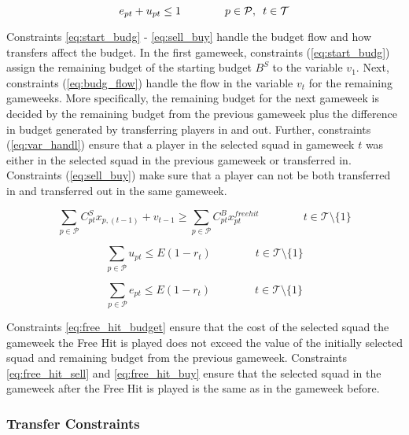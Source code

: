 \begin{equation} \label{eq:sell_buy}
   e_{pt} + u_{pt} \leq 1  \qquad\qquad p \in \mathcal{P}, \enskip t \in \mathcal{T} 
\end{equation}

Constraints \eqref{eq:start_budg} - \eqref{eq:sell_buy} handle the budget flow and how transfers affect the budget. In the first gameweek, constraints (\ref{eq:start_budg}) assign the remaining budget of the starting budget $B^{S}$ to the variable $v_{1}$. Next, constraints (\ref{eq:budg_flow}) handle the flow in the variable $v_{t}$ for the remaining gameweeks. More specifically, the remaining budget for the next gameweek is decided by the remaining budget from the previous gameweek plus the difference in budget generated by transferring players in and out. Further, constraints (\ref{eq:var_handl}) ensure that a player in the selected squad in gameweek $t$ was either in the selected squad in the previous gameweek or transferred in. Constraints (\ref{eq:sell_buy}) make sure that a player can not be both transferred in and transferred out in the same gameweek.


\begin{equation} \label{eq:free_hit_budget}
  \sum_{p \in \mathcal{P}}C_{pt}^{S}x_{p,(t-1)} + v_{t-1} \geq \sum_{p \in \mathcal{P}}C_{pt}^{B} x_{pt}^{free hit} \qquad\qquad t \in \mathcal{T}\setminus\{1\}
\end{equation}

\begin{equation} \label{eq:free_hit_sell}
  \sum_{p \in \mathcal{P}}u_{pt} \leq E (1-r_{t}) \qquad\qquad t \in \mathcal{T}\setminus\{1\}
\end{equation}

\begin{equation} \label{eq:free_hit_buy}
  \sum_{p \in \mathcal{P}}e_{pt} \leq E (1-r_{t}) \qquad\qquad t \in \mathcal{T}\setminus\{1\}
\end{equation}

Constraints \eqref{eq:free_hit_budget} ensure that the cost of the selected squad the gameweek the Free Hit is played does not exceed the value of the initially selected squad and remaining budget from the previous gameweek. Constraints \eqref{eq:free_hit_sell} and \eqref{eq:free_hit_buy} ensure that the selected squad in the gameweek after the Free Hit is played is the same as in the gameweek before. 

\subsubsection{Transfer Constraints} \label{cons:trans}

